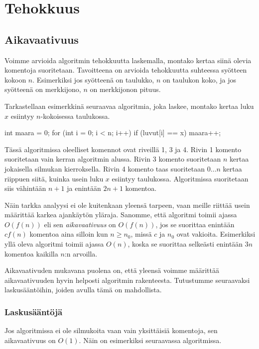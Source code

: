 \chapter{Tehokkuus}

\section{Aikavaativuus}

Voimme arvioida algoritmin tehokkuutta laskemalla,
montako kertaa siinä olevia komentoja suoritetaan.
Tavoitteena on arvioida tehokkuutta suhteessa
syötteen kokoon $n$.
Esimerkiksi jos syötteenä on taulukko,
$n$ on taulukon koko,
ja jos syötteenä on merkkijono,
$n$ on merkkijonon pituus.

Tarkastellaan esimerkkinä seuraavaa algoritmia,
joka laskee, montako kertaa luku $x$ esiintyy
$n$-kokoisessa taulukossa.

\begin{code}[numbers=left]
int maara = 0;
for (int i = 0; i < n; i++) {
    if (luvut[i] == x) {
        maara++;
    }
}
\end{code}

Tässä algoritmissa oleelliset komennot ovat riveillä
1, 3 ja 4.
Rivin 1 komento suoritetaan vain kerran algoritmin alussa.
Rivin 3 komento suoritetaan $n$ kertaa jokaisella silmukan
kierroksella.
Rivin 4 komento taas suoritetaan $0 \dots n$
kertaa riippuen siitä, kuinka usein
luku $x$ esiintyy taulukossa.
Algoritmissa suoritetaan siis vähintään $n+1$ ja enintään $2n+1$
komentoa.

Näin tarkka analyysi ei ole kuitenkaan yleensä tarpeen,
vaan meille riittää usein määrittää karkea ajankäytön yläraja.
Sanomme, että algoritmi toimii ajassa $O(f(n))$ eli sen
\emph{aikavaativuus} on $O(f(n))$, jos se suorittaa
enintään $c f(n)$ komentoa aina silloin kun $n \ge n_0$,
missä $c$ ja $n_0$ ovat vakioita.
Esimerkiksi yllä oleva algoritmi toimii ajassa $O(n)$,
koska se suorittaa selkeästi enintään $3n$ komentoa
kaikilla $n$:n arvoilla.

Aikavaativuden mukavana puolena on, että yleensä voimme
määrittää aikavaativuuden hyvin helposti algoritmin
rakenteesta. Tutustumme seuraavaksi laskusääntöihin,
joiden avulla tämä on mahdollista.

\subsection{Laskusääntöjä}

Jos algoritmissa ei ole silmukoita vaan vain
yksittäisiä komentoja, sen aikavaativuus on $O(1)$.
Näin on esimerkiksi seuraavassa algoritmissa.

